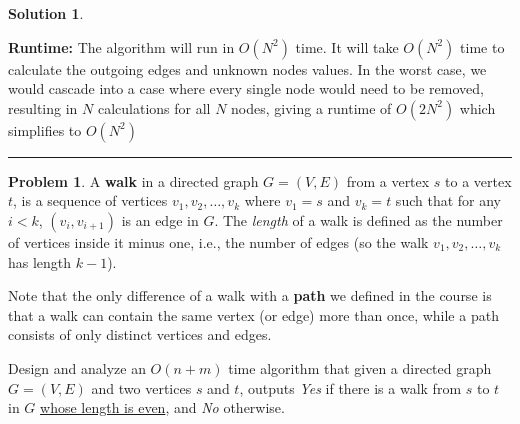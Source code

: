\documentclass{article}
\theoremstyle{definition}
\newtheorem{problem}{Problem}
\def\fline{\rule{0.75\linewidth}{0.5pt}}
\newcommand{\finishline}{\begin{center}\fline\end{center}}
\newtheorem*{solution*}{Solution}
\newenvironment{solution}{\begin{solution*}}{{\finishline} \end{solution*}}
\begin{document}
\begin{solution}
    \

    \textbf{Runtime: }
    The algorithm will run in $O(N^2)$ time. It will take $O(N^2)$ time to calculate the outgoing edges and unknown nodes values. In the worst case, we would cascade into a case where every single node would need to be removed, resulting in $N$ calculations for all $N$ nodes, giving a runtime of $O(2N^2)$ which simplifies to $O(N^2)$


\end{solution}

\newpage




\begin{problem}
A \textbf{walk} in a directed graph $G=(V,E)$ from a vertex $s$ to a vertex $t$, is a sequence of vertices $v_1,v_2,\ldots,v_k$ where $v_1 = s$ and $v_k=t$ such that for any $i < k$,  $(v_i,v_{i+1})$ is an edge in $G$. The \emph{length} of a walk
is defined as the number of vertices inside it minus one, i.e., the number of edges (so the walk $v_1,v_2,\ldots,v_k$ has length $k-1$). 

Note that the only difference 
of a walk with a \textbf{path} we defined in the course is that a walk can contain the same vertex (or edge) more than once, while a path consists of only distinct vertices and edges. 

Design and analyze an $O(n+m)$ time algorithm that given a directed graph $G=(V,E)$ and two vertices $s$ and $t$, outputs \emph{Yes} if there is a walk from $s$ to $t$ in $G$ \underline{whose length is even}, and \emph{No} otherwise. 


\end{problem}
\end{document}
